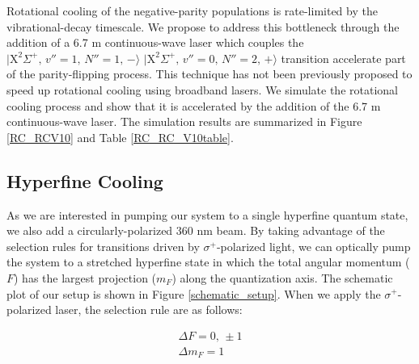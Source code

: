 \documentclass[twoside,twocolumn,9pt]{article}
\begin{document}
Rotational cooling of the negative-parity populations is rate-limited by the vibrational-decay timescale. We propose to address this bottleneck through the addition of a 6.7 \si{\micro}m continuous-wave laser which couples the $\lvert \mathrm{X}^2\Sigma^+,\, v''=1,\, N''=1,\, -\rangle$ \pp{--} $\lvert \mathrm{X}^2\Sigma^+,\, v''=0,\, N''=2,\, +\rangle$ transition  accelerate part of the parity-flipping process. This technique has not been previously proposed to speed up rotational cooling using broadband lasers. We simulate the rotational cooling process and show that it is accelerated by the addition of the 6.7 \si{\micro}m continuous-wave laser. The simulation results are summarized in Figure \ref{RC_RCV10} and Table \ref{RC_RC_V10table}.


\subsection{Hyperfine Cooling}
As we are interested in pumping our system to a single hyperfine quantum state, we also add a circularly-polarized 360 nm beam. By taking advantage of the selection rules for transitions driven by $\sigma^+$-polarized light, we can optically pump the system to a stretched hyperfine state in which the total angular momentum ($F$) has the largest projection ($m_F$) along the quantization axis. The schematic plot of our setup is shown in Figure \ref{schematic_setup}. When we apply the $\sigma^+$-polarized laser, the selection rule are as follows:

\begin{align*}
\Delta F=0,\, \pm 1 \\
\Delta m_F=1
\end{align*}
\end{document}
